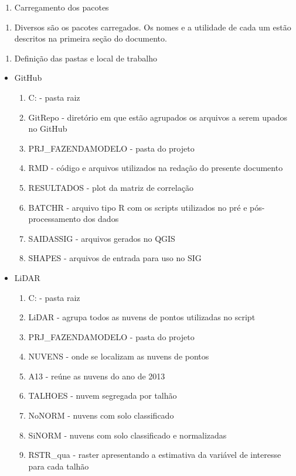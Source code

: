 \documentclass[
]{article}
\providecommand{\tightlist}{%
  \setlength{\itemsep}{0pt}\setlength{\parskip}{0pt}}
\begin{document}
\begin{enumerate}
\def\labelenumi{\arabic{enumi}.}
\tightlist
\item
  Carregamento dos pacotes
\end{enumerate}

\begin{enumerate}
\def\labelenumi{\roman{enumi}.}
\tightlist
\item
  Diversos são os pacotes carregados. Os nomes e a utilidade de cada um
  estão descritos na primeira seção do documento. \newpage
\end{enumerate}

\begin{enumerate}
\def\labelenumi{\arabic{enumi}.}
\setcounter{enumi}{1}
\tightlist
\item
  Definição das pastas e local de trabalho
\end{enumerate}

\begin{itemize}
\tightlist
\item
  GitHub

  \begin{enumerate}
  \def\labelenumi{\roman{enumi}.}
  \tightlist
  \item
    C: - pasta raiz
  \item
    GitRepo - diretório em que estão agrupados os arquivos a serem
    upados no GitHub
  \item
    PRJ\_FAZENDAMODELO - pasta do projeto
  \item
    RMD - código e arquivos utilizados na redação do presente documento
  \item
    RESULTADOS - plot da matriz de correlação
  \item
    BATCHR - arquivo tipo R com os scripts utilizados no pré e
    pós-processamento dos dados
  \item
    SAIDASSIG - arquivos gerados no QGIS
  \item
    SHAPES - arquivos de entrada para uso no SIG
  \end{enumerate}
\item
  LiDAR

  \begin{enumerate}
  \def\labelenumi{\roman{enumi}.}
  \tightlist
  \item
    C: - pasta raiz
  \item
    LiDAR - agrupa todos as nuvens de pontos utilizadas no script
  \item
    PRJ\_FAZENDAMODELO - pasta do projeto
  \item
    NUVENS - onde se localizam as nuvens de pontos
  \item
    A13 - reúne as nuvens do ano de 2013
  \item
    TALHOES - nuvem segregada por talhão
  \item
    NoNORM - nuvens com solo classificado
  \item
    SiNORM - nuvens com solo classificado e normalizadas
  \item
    RSTR\_qua - raster apresentando a estimativa da variável de
    interesse para cada talhão
  \end{enumerate}
\end{itemize}
\end{document}
